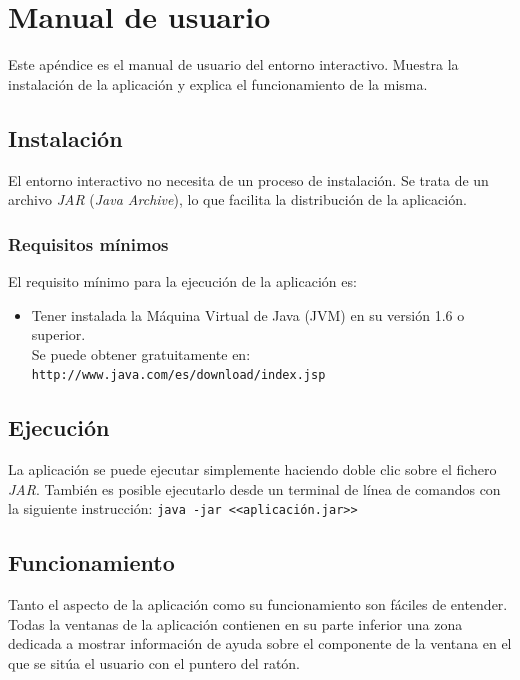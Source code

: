 \appendix
\clearpage %
\addappheadtotoc
\appendixpage

\chapter{Manual de usuario}
\label{cap:manualUsuario}
Este apéndice es el manual de usuario del entorno interactivo.
Muestra la instalación de la aplicación y explica el funcionamiento de la misma.

\section{Instalación}
\label{sec:instalacion}
\par
El entorno interactivo no necesita de un proceso de instalación.
Se trata de un archivo \textit{JAR} (\textit{Java Archive}), lo que facilita la distribución de la aplicación.

\subsection{Requisitos mínimos}
\label{ssec:requisitos_minimos}
El requisito mínimo para la ejecución de la aplicación es:
\begin{itemize}
  \item Tener instalada la Máquina Virtual de Java (JVM) en su versión 1.6 o superior.\\
	Se puede obtener gratuitamente en: \texttt{http://www.java.com/es/download/index.jsp}
\end{itemize}

\section{Ejecución}
La aplicación se puede ejecutar simplemente haciendo doble clic sobre el fichero \textit{JAR}.
También es posible ejecutarlo desde un terminal de línea de comandos con la siguiente instrucción:
\texttt{java -jar <<aplicación.jar>>}

\section{Funcionamiento}
\label{sec:funcionamiento}
Tanto el aspecto de la aplicación como su funcionamiento son fáciles de entender. 
Todas la ventanas de la aplicación contienen en su parte inferior una zona dedicada a mostrar información de ayuda sobre el componente de la ventana en el que se sitúa el usuario con el puntero del ratón.


